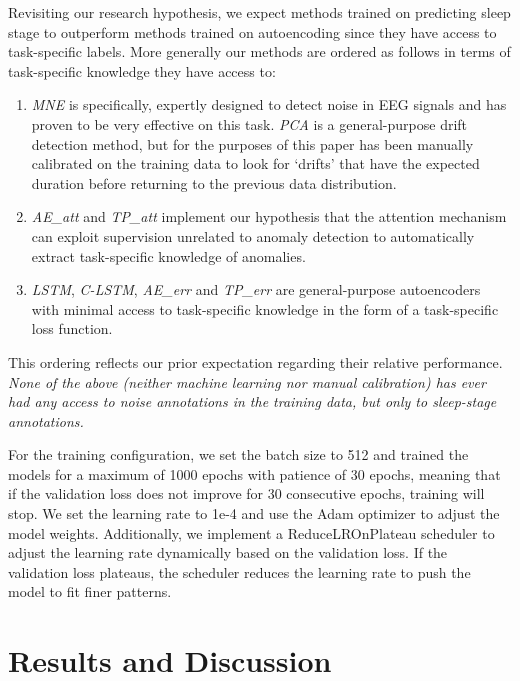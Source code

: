 \documentclass[runningheads]{llncs}
\begin{document}
Revisiting our research hypothesis, we expect methods trained on
predicting sleep stage to outperform methods trained on autoencoding
since they have access to task-specific labels. More generally our
methods are ordered as follows in terms of task-specific knowledge
they have access to:
%
\begin{enumerate}
\item \emph{MNE} is specifically, expertly designed to detect noise in
  EEG signals and has proven to be very effective on this task.
  \emph{PCA} is a general-purpose drift detection method, but for
  the purposes of this paper has been manually calibrated on the
  training data to look for `drifts' that have the expected duration
  before returning to the previous data distribution.
\item \emph{AE\_att} and \emph{TP\_att} implement our hypothesis that
  the attention mechanism can exploit supervision unrelated to anomaly
  detection to automatically extract task-specific knowledge of
  anomalies.
\item \emph{LSTM}, \emph{C-LSTM}, \emph{AE\_err} and \emph{TP\_err}
  are general-purpose autoencoders with minimal access to task-specific
  knowledge in the form of a task-specific loss function.
\end{enumerate}
%
This ordering reflects our prior expectation regarding their relative
performance. \emph{None of the above (neither machine learning nor
manual calibration) has ever had any access to noise annotations
in the training data, but only to sleep-stage annotations.}

For the training configuration, we set the batch size to 512 and
trained the models for a maximum of 1000 epochs with patience of 30
epochs, meaning that if the validation loss does not improve for 30
consecutive epochs, training will stop. We set the learning rate to
1e-4 and use the Adam optimizer to adjust the model
weights. Additionally, we implement a ReduceLROnPlateau scheduler to
adjust the learning rate dynamically based on the validation loss. If
the validation loss plateaus, the scheduler reduces the learning rate
to push the model to fit finer patterns.



\section{Results and Discussion}
\label{sec:results}
\end{document}
